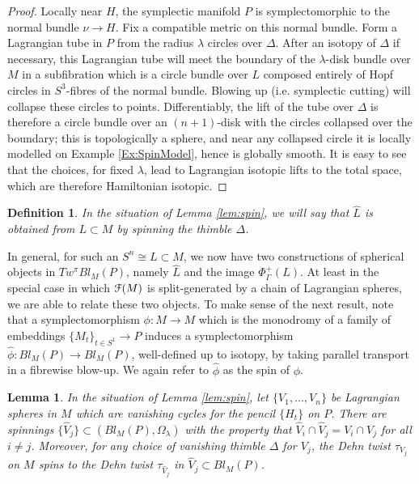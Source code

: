 \documentclass[reqno,10pt]{amsart}
\numberwithin{equation}{section}
\newcommand{\scrF}{\EuScript{F}}
\newtheorem{Lemma}[thm]{Lemma}
\newtheorem{Definition}[thm]{Definition}
\theoremstyle{remark}
\begin{document}
\begin{proof}
Locally near $H$, the symplectic manifold $P$ is symplectomorphic to the normal bundle $\nu\rightarrow H$. Fix a compatible metric on this normal bundle.  Form a Lagrangian tube in $P$ from the radius $\lambda$ circles over $\Delta$. After an isotopy of $\Delta$  if necessary, this Lagrangian tube will meet the boundary of the $\lambda$-disk bundle over $M$ in a subfibration which is a circle bundle over $L$ composed entirely of Hopf circles in $S^3$-fibres of the normal bundle. Blowing up (i.e. symplectic cutting) will collapse these circles to points. Differentiably, the lift of the tube over $\Delta$ is therefore a circle bundle over an $(n+1)$-disk with the circles collapsed  over the boundary; this is topologically a sphere, and near any collapsed circle it is locally modelled on Example \ref{Ex:SpinModel}, hence is globally smooth. It is easy to see that the choices, for fixed $\lambda$, lead to Lagrangian isotopic lifts to the total space, which are therefore Hamiltonian isotopic.  
\end{proof}

\begin{Definition}\label{Definition:SpunSphere}
In the situation of Lemma \ref{lem:spin}, we will say that $\hat{L}$ is obtained from $L \subset M$ by \emph{spinning} the thimble $\Delta$.
\end{Definition}

In general, for such an $S^n \cong L \subset M$, we now have two constructions of spherical objects in $Tw^{\pi} Bl_M(P)$, namely $\hat{L}$ and the image $\Phi_{\Gamma}^+(L)$.  At least in the special case in which $\scrF(M)$ is split-generated by a chain of Lagrangian spheres, we are able to relate these two objects. 
 To make sense of the next result, note that a symplectomorphism $\phi: M \rightarrow M$ which is the monodromy of a family of embeddings $\{M_t\}_{t\in S^1} \rightarrow P$ induces a symplectomorphism $\hat{\phi}: Bl_M(P) \rightarrow Bl_M(P)$, well-defined up to isotopy, by  taking parallel transport in a fibrewise blow-up. We again refer to $\hat{\phi}$ as the spin of $\phi$.



\begin{Lemma} \label{lem:SpinMany}
In the situation of Lemma \ref{lem:spin}, let $\{V_1,\ldots, V_n\}$ be Lagrangian spheres in $M$ which are vanishing cycles for the pencil $\{H_t\}$ on $P$. There are spinnings $\{\hat{V}_j\} \subset (Bl_M(P), \Omega_{\lambda})$ with the property that $\hat{V}_i \cap \hat{V}_j = V_i\cap V_j$ for all $i \neq j$.  Moreover,  for any choice of vanishing thimble $\Delta$ for $V_j$, the Dehn twist $\tau_{V_j}$ on $M$ spins to the Dehn twist $\tau_{\hat{V}_j}$ in $\hat{V}_j \subset Bl_M(P)$.
\end{Lemma}
\end{document}
